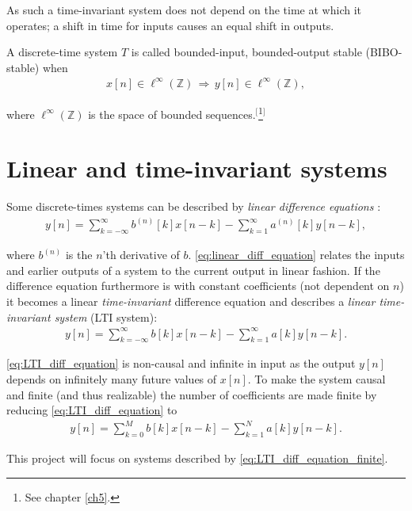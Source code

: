 As such a time-invariant system does not depend on the time at which it operates; a shift in time for inputs causes an equal shift in outputs.

\begin{definition}\label{def:BIBO_stable_system}
A discrete-time system $T$ is called bounded-input, bounded-output stable (BIBO-stable) when
\begin{align}
x[n]\in\ell^{\infty}(\mathbb{Z})\,\Rightarrow\,y[n]\in\ell^{\infty}(\mathbb{Z}),
\end{align}

where $\ell^{\infty}(\mathbb{Z})$ is the space of bounded sequences.$^[$\footnote{See chapter \ref{ch5}.}$^]$
\end{definition}

\section{Linear and time-invariant systems}\label{sec:LTI}
Some discrete-times systems can be described by \textit{linear difference equations} \cite{page 202, FSP}:
\begin{align} \label{eq:linear_diff_equation}
y[n] = \sum_{k=-\infty}^{\infty} b^{(n)} [k] x[n-k] - \sum_{k=1}^{\infty} a^{(n)} [k] y[n-k],
\end{align}

where $b^{(n)}$ is the $n$'th derivative of $b$. \eqref{eq:linear_diff_equation} relates the inputs and earlier outputs of a system to the current output in linear fashion. If the difference equation furthermore is with constant coefficients (not dependent on $n$) it becomes a linear \textit{time-invariant} difference equation and describes a \textit{linear time-invariant system} (LTI system):
\begin{align}\label{eq:LTI_diff_equation}
y[n] = \sum_{k=-\infty}^{\infty} b[k] x[n-k] - \sum_{k=1}^{\infty} a[k] y[n-k].
\end{align}

\eqref{eq:LTI_diff_equation} is non-causal and infinite in input as the output $y[n]$ depends on infinitely many future values of $x[n]$. To make the system causal and finite (and thus realizable) the number of coefficients are made finite by reducing \eqref{eq:LTI_diff_equation} to
\begin{align}\label{eq:LTI_diff_equation_finite}
y[n] = \sum_{k=0}^M b[k] x[n-k] - \sum_{k=1}^N a[k] y[n-k].
\end{align}

This project will focus on systems described by \eqref{eq:LTI_diff_equation_finite}.


